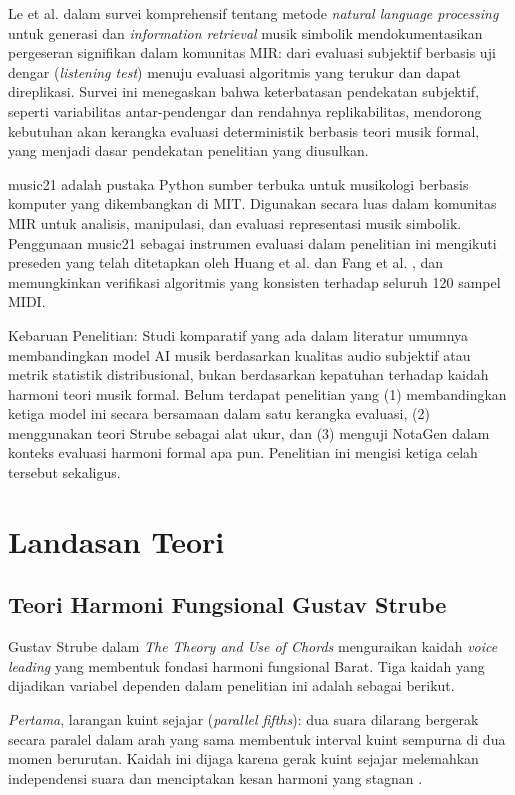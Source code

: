 Le et al. \parencite{le2025} dalam survei komprehensif tentang metode \textit{natural language processing} untuk generasi dan \textit{information retrieval} musik simbolik mendokumentasikan pergeseran signifikan dalam komunitas MIR: dari evaluasi subjektif berbasis uji dengar (\textit{listening test}) menuju evaluasi algoritmis yang terukur dan dapat direplikasi. Survei ini menegaskan bahwa keterbatasan pendekatan subjektif, seperti variabilitas antar-pendengar dan rendahnya replikabilitas, mendorong kebutuhan akan kerangka evaluasi deterministik berbasis teori musik formal, yang menjadi dasar pendekatan penelitian yang diusulkan.

music21 \parencite{cuthbert2010} adalah pustaka Python sumber terbuka untuk musikologi berbasis komputer yang dikembangkan di MIT. Digunakan secara luas dalam komunitas MIR untuk analisis, manipulasi, dan evaluasi representasi musik simbolik. Penggunaan music21 sebagai instrumen evaluasi dalam penelitian ini mengikuti preseden yang telah ditetapkan oleh Huang et al. \parencite{huang2017} dan Fang et al. \parencite{fang2020}, dan memungkinkan verifikasi algoritmis yang konsisten terhadap seluruh 120 sampel MIDI.

Kebaruan Penelitian: Studi komparatif yang ada dalam literatur umumnya membandingkan model AI musik berdasarkan kualitas audio subjektif atau metrik statistik distribusional, bukan berdasarkan kepatuhan terhadap kaidah harmoni teori musik formal. Belum terdapat penelitian yang (1) membandingkan ketiga model ini secara bersamaan dalam satu kerangka evaluasi, (2) menggunakan teori Strube sebagai alat ukur, dan (3) menguji NotaGen dalam konteks evaluasi harmoni formal apa pun. Penelitian ini mengisi ketiga celah tersebut sekaligus.

\section{Landasan Teori}

\subsection{Teori Harmoni Fungsional Gustav Strube}

Gustav Strube dalam \textit{The Theory and Use of Chords} \parencite{strube1928} menguraikan kaidah \textit{voice leading} yang membentuk fondasi harmoni fungsional Barat. Tiga kaidah yang dijadikan variabel dependen dalam penelitian ini adalah sebagai berikut.

\textit{Pertama}, larangan kuint sejajar (\textit{parallel fifths}): dua suara dilarang bergerak secara paralel dalam arah yang sama membentuk interval kuint sempurna di dua momen berurutan. Kaidah ini dijaga karena gerak kuint sejajar melemahkan independensi suara dan menciptakan kesan harmoni yang stagnan \parencite{harrison2020}.


